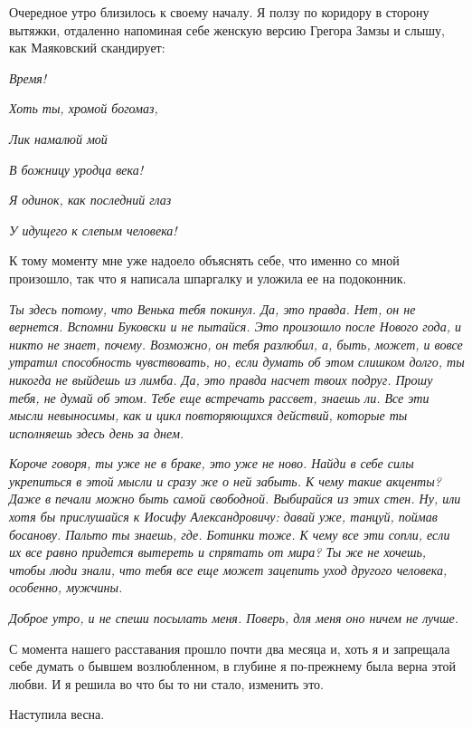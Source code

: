 \documentclass[
]{book}
\begin{document}
Очередное утро близилось к своему началу. Я ползу по коридору в сторону вытяжки, отдаленно напоминая себе женскую версию Грегора Замзы и слышу, как Маяковский скандирует:

\emph{Время!}

\emph{Хоть ты, хромой богомаз,}

\emph{Лик намалюй мой}

\emph{В божницу уродца века!}

\emph{Я одинок, как последний глаз}

\emph{У идущего к слепым человека!}

К тому моменту мне уже надоело объяснять себе, что именно со мной произошло, так что я написала шпаргалку и уложила ее на подоконник.

\emph{Ты здесь потому, что Венька тебя покинул. Да, это правда. Нет, он не вернется. Вспомни Буковски и не пытайся. Это произошло после Нового года, и никто не знает, почему. Возможно, он тебя разлюбил, а, быть, может, и вовсе утратил способность чувствовать, но, если думать об этом слишком долго, ты никогда не выйдешь из лимба. Да, это правда насчет твоих подруг. Прошу тебя, не думай об этом. Тебе еще встречать рассвет, знаешь ли. Все эти мысли невыносимы, как и цикл повторяющихся действий, которые ты исполняешь здесь день за днем.}

\emph{Короче говоря, ты уже не в браке, это уже не ново. Найди в себе силы укрепиться в этой мысли и сразу же о ней забыть. К чему такие акценты? Даже в печали можно быть самой свободной. Выбирайся из этих стен. Ну, или хотя бы прислушайся к Иосифу Александровичу: давай уже, танцуй, поймав босанову. Пальто ты знаешь, где. Ботинки тоже. К чему все эти сопли, если их все равно придется вытереть и спрятать от мира? Ты же не хочешь, чтобы люди знали, что тебя все еще может зацепить уход другого человека, особенно, мужчины.}

\emph{Доброе утро, и не спеши посылать меня. Поверь, для меня оно ничем не лучше.}

С момента нашего расставания прошло почти два месяца и, хоть я и запрещала себе думать о бывшем возлюбленном, в глубине я по-прежнему была верна этой любви. И я решила во что бы то ни стало, изменить это.

Наступила весна.

\hypertarget{chapter-93}{%
\chapter{~}\label{chapter-93}}
\end{document}
